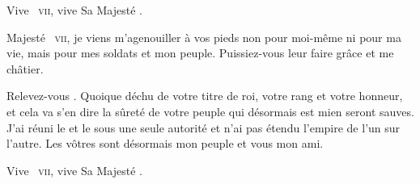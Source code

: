 \begin{drama}
  \peuplespeaks Vive \elena~\textsc{vii}, vive Sa Majesté \ela.

  \dariusspeaks {} Majesté \elena~\textsc{vii}, je viens m’agenouiller à vos pieds non pour moi-même ni pour ma vie, mais pour mes soldats et mon peuple. Puissiez-vous leur faire grâce et me châtier.

  \elenaspeaks Relevez-vous \darius. Quoique déchu de votre titre de roi, votre rang et votre honneur, et cela va s’en dire la sûreté de votre peuple qui désormais est mien seront sauves. J’ai réuni le \campprincipal{} et le \campoppose{} sous une seule autorité et n’ai pas étendu l’empire de l’un sur l’autre. Les vôtres sont désormais mon peuple et vous mon ami.

   Vive \elena~\textsc{vii}, vive Sa Majesté \ela.



\end{drama}








